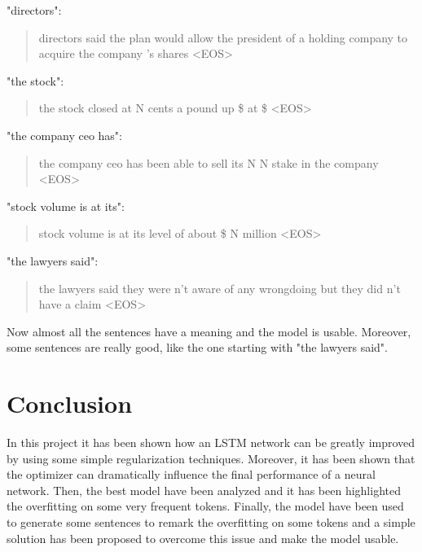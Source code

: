 \documentclass[a4paper]{article}
\begin{document}
"directors":
\begin{quote}
    directors said the plan would allow the president of a holding company to acquire the company 's shares <EOS>
\end{quote}

"the stock":
\begin{quote}
    the stock closed at N cents a pound up \$ at \$ <EOS>
\end{quote}

"the company ceo has":
\begin{quote}
    the company ceo has been able to sell its N N stake in the company <EOS>
\end{quote}

"stock volume is at its":
\begin{quote}
    stock volume is at its level of about \$ N million <EOS>
\end{quote}

"the lawyers said":
\begin{quote}
the lawyers said they were n't aware of any wrongdoing but they did n't have a claim <EOS>
\end{quote}

Now almost all the sentences have a meaning and the model is usable. Moreover, some sentences are really good, like the one starting with "the lawyers said".

\section{Conclusion}
In this project it has been shown how an LSTM network can be greatly improved by using some
simple regularization techniques. Moreover, it has been shown that the optimizer
can dramatically influence the final performance of a neural network. Then, the best model have been 
analyzed and it has been highlighted the overfitting on some very frequent tokens. Finally, the model
have been used to generate some sentences to remark the overfitting on some tokens and a simple solution
has been proposed to overcome this issue and make the model usable.




\end{document}
